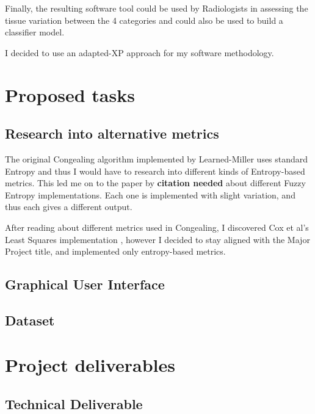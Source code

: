 \documentclass[11pt,fleqn,twoside]{article}
\begin{document}
Finally, the resulting software tool could be used by Radiologists in assessing the tissue variation between the 4 categories and could also be used to build a classifier model.

I decided to use an adapted-XP approach for my software methodology.

\section{Proposed tasks}

\subsection{Research into alternative metrics}
\label{ssec:alt-met}
The original Congealing algorithm implemented by Learned-Miller uses standard Entropy and thus I would have to research into different kinds of Entropy-based metrics. This led me on to the paper by \textbf{citation needed} about different Fuzzy Entropy implementations. Each one is implemented with slight variation, and thus each gives a different output.

After reading about different metrics used in Congealing, I discovered Cox et al's Least Squares implementation \cite{least-squares-congealing}, however I decided to stay aligned with the Major Project title, and implemented only entropy-based metrics.

\subsection{Graphical User Interface}

\subsection{Dataset}

\section{Project deliverables}

\subsection{Technical Deliverable}
\end{document}
